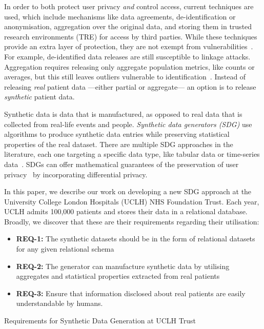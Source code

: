 \documentclass[11pt]{article}
\begin{document}
In order to both protect user privacy \emph{and} control access, current techniques are used, which include mechanisms like data agreements, de-identification or anonymisation, aggregation over the original data, and storing them in trusted research environments (TRE) for access by third parties. While these techniques provide an extra layer of protection, they are not exempt from vulnerabilities~\cite{near2021}. For example, de-identified data releases are still susceptible to linkage attacks. Aggregation requires releasing only aggregate population metrics, like counts or averages, but this still leaves outliers vulnerable to identification~\cite{tucker2020}. Instead of releasing \emph{real} patient data ---either partial or aggregate--- an option is to release \emph{synthetic} patient data. 

Synthetic data is data that is manufactured, as opposed to real data that is collected from real-life events and people. \emph{Synthetic data generators (SDG)} use algorithms to produce synthetic data entries while preserving statistical properties of the real dataset. There are multiple SDG approaches in the literature, each one targeting a specific data type, like tabular data or time-series data~\cite{DBLP:journals/corr/abs-2205-03257}.
SDGs can offer mathematical guarantees of the preservation of user privacy~\cite{Kopp2021MicrosoftSD, Cai2023} by incorporating differential privacy.

In this paper, we describe our work on developing a new SDG approach at the University College London Hospitals (UCLH) NHS Foundation Trust. Each year, UCLH admits 100,000 patients and stores their data in a relational database. Broadly, we discover that these are their requirements regarding their utilisation:

\begin{listing}[ht]
\begin{itemize}
    \item \textbf{REQ-1:} The synthetic datasets should be in the form of relational datasets for any given relational schema
    \item \textbf{REQ-2:} The generator can manufacture synthetic data by utilising aggregates and statistical properties extracted from real patients
    \item \textbf{REQ-3:} Ensure that information disclosed about real patients are easily understandable by humans. 
\end{itemize}
\caption{Requirements for Synthetic Data Generation at UCLH Trust}
\label{lst:UCLH Requirements}
\end{listing}
\end{document}

